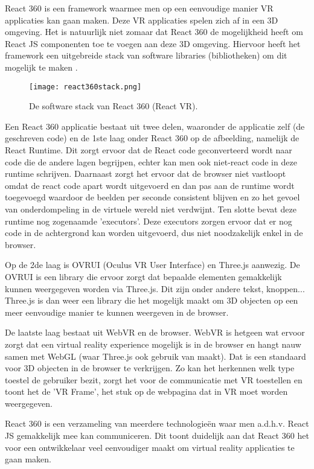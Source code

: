 React 360 is een framework waarmee men op een eenvoudige manier VR applicaties kan gaan maken. Deze VR applicaties spelen zich af in een 3D omgeving. Het is natuurlijk niet zomaar dat React 360 de mogelijkheid heeft om React JS componenten toe te voegen aan deze 3D omgeving. Hiervoor heeft het framework een uitgebreide stack van software libraries (bibliotheken) om dit mogelijk te maken \autocite{Bieronski2016}.

\begin{figure}[H]
	\centering
	\texttt{[image: react360stack.png]}
	\caption{De software stack van React 360 (React VR).}
	\label{fig:react360-stack}
\end{figure}

Een React 360 applicatie bestaat uit twee delen, waaronder de applicatie zelf (de geschreven code) en de 1ste laag onder React 360 op de afbeelding,  namelijk de React Runtime. Dit zorgt ervoor dat de React code geconverteerd wordt naar code die de andere lagen begrijpen, echter kan men ook niet-react code in deze runtime schrijven. Daarnaast zorgt het ervoor dat de browser niet vastloopt omdat de react code apart wordt uitgevoerd en dan pas aan de runtime wordt toegevoegd waardoor de beelden per seconde consistent blijven en zo het gevoel van onderdompeling in de virtuele wereld niet verdwijnt. Ten slotte bevat deze runtime nog zogenaamde 'executors'. Deze executors zorgen ervoor dat er nog code in de achtergrond kan worden uitgevoerd, dus niet noodzakelijk enkel in de browser.

Op de 2de laag is OVRUI (Oculus VR User Interface) en Three.js aanwezig. De OVRUI is een library die ervoor zorgt dat bepaalde elementen gemakkelijk kunnen weergegeven worden via Three.js. Dit zijn onder andere tekst, knoppen... Three.js is dan weer een library die het mogelijk maakt om 3D objecten op een meer eenvoudige manier te kunnen weergeven in de browser.

De laatste laag bestaat uit WebVR en de browser. WebVR is hetgeen wat ervoor zorgt dat een virtual reality experience mogelijk is in de browser en hangt nauw samen met WebGL (waar Three.js ook gebruik van maakt). Dat is een standaard voor 3D objecten in de browser te verkrijgen. Zo kan het herkennen welk type toestel de gebruiker bezit, zorgt het voor de communicatie met VR toestellen en toont het de 'VR Frame', het stuk op de webpagina dat in VR moet worden weergegeven. 

React 360 is een verzameling van meerdere technologieën waar men a.d.h.v. React JS gemakkelijk mee kan communiceren. Dit toont duidelijk aan dat React 360 het voor een ontwikkelaar veel eenvoudiger maakt om virtual reality applicaties te gaan maken.

